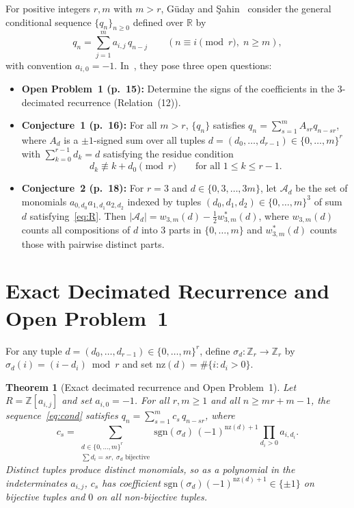 \documentclass[11pt]{article}
\newtheorem{theorem}{Theorem}
\theoremstyle{remark}
\begin{document}
For positive integers $r, m$ with $m > r$, G\"uday and \c{S}ahin~\cite{GudaySahin2026} consider the general conditional sequence $\{q_n\}_{n \ge 0}$ defined over $\mathbb{R}$ by
\begin{equation}\label{eq:cond}
q_n = \sum_{j=1}^{m} a_{i, j}\, q_{n-j} \qquad (n \equiv i \pmod{r},\; n \ge m),
\end{equation}
with convention $a_{i,0} = -1$. In~\cite[pp.~15--18]{GudaySahin2026}, they pose three open questions:
\begin{itemize}
\item \textbf{Open Problem~1 (p.~15):} Determine the signs of the coefficients in the $3$-decimated recurrence (Relation~(12)).
\item \textbf{Conjecture~1 (p.~16):} For all $m > r$, $\{q_n\}$ satisfies $q_n = \sum_{s=1}^{m} A_{sr} q_{n-sr}$, where $A_d$ is a $\pm 1$-signed sum over all tuples $d = (d_0, \dots, d_{r-1}) \in \{0, \dots, m\}^r$ with $\sum_{k=0}^{r-1} d_k = d$ satisfying the residue condition
\begin{equation}\label{eq:R}
d_k \not\equiv k + d_0 \pmod{r} \qquad \text{for all } 1 \le k \le r - 1.
\end{equation}
\item \textbf{Conjecture~2 (p.~18):} For $r = 3$ and $d \in \{0, 3, \dots, 3m\}$, let $\mathcal{A}_d$ be the set of monomials $a_{0,d_0} a_{1,d_1} a_{2,d_2}$ indexed by tuples $(d_0, d_1, d_2) \in \{0, \dots, m\}^3$ of sum $d$ satisfying~\eqref{eq:R}. Then $|\mathcal{A}_d| = w_{3,m}(d) - \tfrac{1}{2} w^*_{3,m}(d)$, where $w_{3,m}(d)$ counts all compositions of $d$ into $3$ parts in $\{0, \dots, m\}$ and $w^*_{3,m}(d)$ counts those with pairwise distinct parts.
\end{itemize}

\section{Exact Decimated Recurrence and Open Problem~1}

For any tuple $d = (d_0, \dots, d_{r-1}) \in \{0, \dots, m\}^r$, define $\sigma_d : \mathbb{Z}_r \to \mathbb{Z}_r$ by $\sigma_d(i) = (i - d_i) \bmod r$ and set $\mathrm{nz}(d) = \#\{i : d_i > 0\}$.

\begin{theorem}[Exact decimated recurrence and Open Problem~1]\label{thm:exact}
Let $R = \mathbb{Z}[a_{i,j}]$ and set $a_{i,0} = -1$. For all $r, m \ge 1$ and all $n \ge mr + m - 1$, the sequence~\eqref{eq:cond} satisfies $q_n = \sum_{s=1}^{m} c_s\, q_{n-sr}$, where
\[
c_s = \sum_{\substack{d \in \{0,\dots,m\}^r \\ \sum d_i = sr,\; \sigma_d \text{ bijective}}}
\mathrm{sgn}(\sigma_d)\, (-1)^{\mathrm{nz}(d)+1} \prod_{d_i > 0} a_{i, d_i}.
\]
Distinct tuples produce distinct monomials, so as a polynomial in the indeterminates $a_{i,j}$, $c_s$ has coefficient $\mathrm{sgn}(\sigma_d)(-1)^{\mathrm{nz}(d)+1} \in \{\pm 1\}$ on bijective tuples and $0$ on all non-bijective tuples.
\end{theorem}
\end{document}
